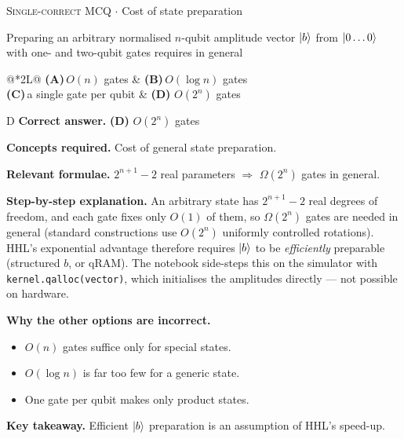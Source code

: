 \documentclass[11pt,a4paper]{article}
\newcommand{\optlabel}[1]{\textbf{(#1)}}
\newcommand{\correctlabel}[1]{\textcolor{okgreen}{\textbf{(#1)}\,\ding{51}}}
\newenvironment{qitem}[1]{\begin{list}{}{\setlength{\leftmargin}{3.3em}\setlength{\labelwidth}{3.1em}%
  \setlength{\labelsep}{0.2em}\setlength{\topsep}{3pt}\setlength{\parsep}{3pt}}\item[\textbf{Q.#1}\hfill]}{\end{list}}
\newcommand{\qsep}{\par\vspace{2pt}{\color{black!15}\hrule}\vspace{4pt}}
\newcommand{\qmeta}[2]{{\footnotesize\color{black!60}\textsc{#1} \;$\cdot$\; #2}\par}
\begin{document}
\begin{qitem}{34}
\qmeta{Single-correct MCQ}{Cost of state preparation}
Preparing an arbitrary normalised $n$-qubit amplitude vector $\ket b$ from $\ket{0\dots0}$ with one- and two-qubit gates requires in general
\par\smallskip\noindent\begin{tabularx}{\linewidth}{@{}*{2}{L}@{}}
\optlabel{A}\,$O(n)$ gates & \optlabel{B}\,$O(\log n)$ gates \\[3pt]
\optlabel{C}\,a single gate per qubit & \correctlabel{D}\,$O(2^n)$ gates
\end{tabularx}
\end{qitem}
\begin{solbox}{D}
\textbf{\color{brand}Correct answer.} \textcolor{okgreen}{\textbf{(D)}} $O(2^n)$ gates

\textbf{\color{brand}Concepts required.} Cost of general state preparation.

\textbf{\color{brand}Relevant formulae.} $2^{n+1} - 2$ real parameters $\Rightarrow$ $\Omega(2^n)$ gates in general.

\textbf{\color{brand}Step-by-step explanation.} An arbitrary state has $2^{n+1} - 2$ real degrees of freedom, and each gate fixes only $O(1)$ of them, so $\Omega(2^n)$ gates are needed in general (standard constructions use $O(2^n)$
uniformly controlled rotations). HHL's exponential advantage therefore requires $\ket b$ to be \emph{efficiently} preparable (structured $b$, or qRAM). The notebook
side-steps this on the simulator with \texttt{kernel.qalloc(vector)}, which initialises the amplitudes directly --- not possible on hardware.

\textbf{\color{brand}Why the other options are incorrect.}
\begin{itemize}[leftmargin=2.4em, itemsep=1pt, topsep=2pt]
\item[\textbf{(A)}] $O(n)$ gates suffice only for special states.
\item[\textbf{(B)}] $O(\log n)$ is far too few for a generic state.
\item[\textbf{(C)}] One gate per qubit makes only product states.
\end{itemize}
\textbf{\color{brand}Key takeaway.} Efficient $\ket b$ preparation is an assumption of HHL's speed-up.
\end{solbox}
\qsep
\end{document}
